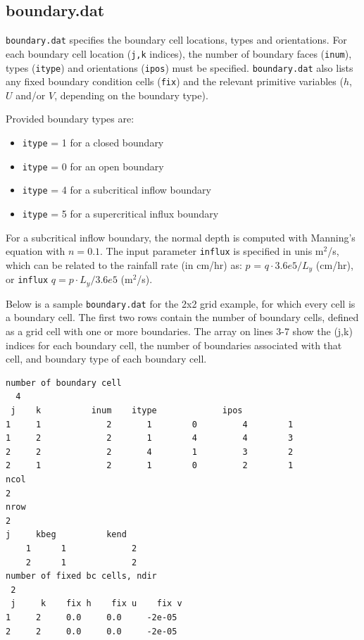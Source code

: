 \documentclass{article}
\newcommand{\code}[1]{\texttt{#1}}
\begin{document}
 
%  
\subsection{boundary.dat}

\code{boundary.dat} specifies the boundary cell locations, types and orientations.  
For each boundary cell location (\code{j,k} indices), the number of boundary faces (\code{inum}), types (\code{itype}) and orientations (\code{ipos}) must be specified.
\code{boundary.dat} also lists any fixed boundary condition cells (\code{fix}) and the relevant primitive variables ($h$, $U$ and/or $V$, depending on the boundary type).

Provided boundary types are:
\begin{itemize}
	\item  \code{itype} = 1 for a closed boundary
	\item  \code{itype} = 0 for an open boundary
	\item  \code{itype} = 4 for 	 a subcritical inflow boundary
	\item  \code{itype} = 5 for a supercritical influx boundary
 \end{itemize}
 
For a subcritical inflow boundary,  the normal depth is computed  with Manning's equation with $n=0.1$.  
The input parameter \code{influx} is specified in unis m$^2$/s, which can be related to the rainfall rate (in cm/hr) as: $p$ = $q\cdot 3.6e5/L_y $ (cm/hr), or  \code{influx}  $q = p\cdot L_y/3.6e5$  (m$^2$/s).


Below is a sample \code{boundary.dat} for the 2x2 grid example, for which every cell is a boundary cell. 
The first two rows contain the number of boundary cells, defined as a grid cell with one or more boundaries.
The array on lines 3-7 show the (j,k) indices for each boundary cell, the number of boundaries associated with that cell, and boundary type of each boundary cell.

\begin{verbatim}
number of boundary cell 
  4 
 j    k          inum    itype             ipos 
1     1             2       1        0         4        1      
1     2             2       1        4         4        3      
2     2             2       4        1         3        2      
2     1             2       1        0         2        1      
ncol
2
nrow
2
j     kbeg          kend 
    1      1             2   
    2      1             2   
number of fixed bc cells, ndir    
 2  
 j     k    fix h    fix u    fix v	
1     2     0.0     0.0     -2e-05     
2     2     0.0     0.0     -2e-05     
\end{verbatim}
\end{document}
